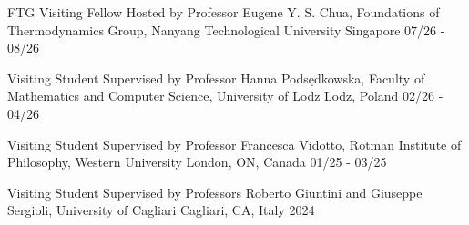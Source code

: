 

\begin{cvhonors}
 \cvhonor
    {FTG Visiting Fellow} %
    {Hosted by Professor Eugene Y. S. Chua, Foundations of Thermodynamics Group, Nanyang Technological University} %
    {Singapore} %
    {07/26 - 08/26} %

\end{cvhonors}
\begin{cvhonors}



  \cvhonor
    {Visiting Student} %
    {Supervised by Professor Hanna Podsędkowska, Faculty of Mathematics and Computer Science, University of Lodz} %
    {Lodz, Poland} %
    {02/26 - 04/26} %



  \cvhonor
    {Visiting Student} %
    {Supervised by Professor Francesca Vidotto, Rotman Institute of Philosophy, Western University} %
    {London, ON, Canada} %
    {01/25 - 03/25} %

    \end{cvhonors}

\begin{cvhonors}
\cvhonor
   {Visiting Student} %
    {Supervised by Professors Roberto Giuntini and Giuseppe Sergioli, University of Cagliari} %
    {Cagliari, CA, Italy} %
    {2024} %

\end{cvhonors}

  


 
